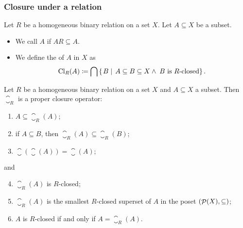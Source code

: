 \subsubsection{Closure under a relation}
\begin{definition}
Let $R$ be a homogeneous binary relation on a set $X$. Let $A\subseteq X$ be a subset.
\begin{itemize}
\item We call $A$  if $AR \subseteq A$.
\item We define the  of $A$ in $X$ as
\[ \operatorname{Cl}_R(A) \coloneqq \bigcap \left\{\left. B \;\right|\; A \subseteq B \subseteq X \land \;\text{$B$ is $R$-closed} \right\}. \]
\end{itemize}
\end{definition}

\begin{proposition} \label{prop:RclosureIsClosure}
Let $R$ be a homogeneous binary relation on a set $X$ and $A\subseteq X$ a subset. Then $\closure_R$ is a proper closure operator:
\begin{enumerate}
\item $A \subseteq \closure_R(A)$;
\item if $A\subseteq B$, then $\closure_R(A) \subseteq \closure_R(B)$;
\item $\closure(\closure(A)) = \closure(A)$;
\end{enumerate}
and
\begin{enumerate} \setcounter{enumi}{3}
\item $\closure_R(A)$ is $R$-closed;
\item $\closure_R(A)$ is the smallest $R$-closed superset of $A$ in the poset $\left( \mathop{\mathcal{P}}(X),\subseteq \right)$;
\item $A$ is $R$-closed \textup{if and only if} $A = \closure_R(A)$.
\end{enumerate}
\end{proposition}

